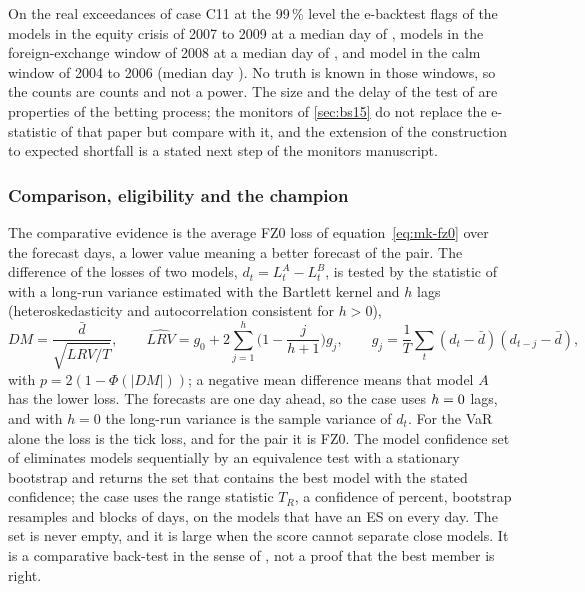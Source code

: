 On the real exceedances of case C11 at the 99\,\% level the e-backtest flags \pxPpFifteenWwzEquity{} of the models in the equity crisis of 2007 to
2009 at a median day of \pxPpFifteenWwzEquityMed{}, \pxPpFifteenWwzFx{} models in the foreign-exchange window of 2008 at a median day of
\pxPpFifteenWwzFxMed{}, and \pxPpFifteenWwzCalm{} model in the calm window of 2004 to 2006 (median day \pxPpFifteenWwzCalmMed{}). No truth is known in
those windows, so the counts are counts and not a power. The size and the delay of the test of \citet{proposed:wang2022} are properties of the
betting process; the monitors of \cref{sec:bs15} do not replace the e-statistic of that paper but compare with it, and the extension of the
construction to expected shortfall is a stated next step of the monitors manuscript.

\subsubsection{Comparison, eligibility and the champion}
The comparative evidence is the average FZ0 loss of equation~\eqref{eq:mk-fz0} over the forecast days, a lower value meaning a better forecast of the pair.
The difference of the losses of two models, $d_t=L_t^{A}-L_t^{B}$, is tested by the statistic of \citet{market:dieboldmariano1995} with a
long-run variance estimated with the Bartlett kernel and $h$ lags (heteroskedasticity and autocorrelation consistent for $h>0$),
\begin{equation}
DM=\frac{\bar d}{\sqrt{\widehat{LRV}/T}},\qquad
\widehat{LRV}=g_0+2\sum_{j=1}^{h}\Big(1-\frac j{h+1}\Big)g_j,\qquad g_j=\frac1T\sum_t(d_t-\bar d)(d_{t-j}-\bar d),
\label{eq:mk-dm}
\end{equation}
with $p=2(1-\Phi(|DM|))$; a negative mean difference means that model $A$ has the lower loss. The forecasts are one day ahead, so
the case uses $h=0{}$ lags, and with $h=0$ the long-run variance is the sample variance of $d_t$. For the VaR alone the loss is the tick loss, and for the pair it is FZ0. The model confidence set of
\citet{market:hansenlundenason2011} eliminates models sequentially by an equivalence test with a stationary bootstrap and returns the set that contains the
best model with the stated confidence; the case uses the range statistic $T_R$, a confidence of \mkMcsConf{} percent, \mkMcsBoot{} bootstrap
resamples and blocks of \mkMcsBlock{} days, on the models that have an ES on every day. The set is never empty, and it is large when the score cannot separate
close models. It is a comparative back-test in the sense of \citet{market:noldeziegel2017}, not a proof that the best member is right.


